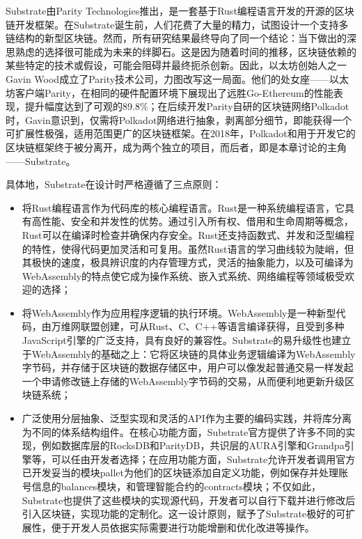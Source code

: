 Substrate\cite{substrateHome}由Parity Technologies推出，是一套基于Rust编程语言开发的开源的区块链开发框架。在Substrate诞生前，人们花费了大量的精力，试图设计一个支持多链结构的新型区块链。然而，所有研究结果最终导向了同一个结论：当下做出的深思熟虑的选择很可能成为未来的绊脚石。这是因为随着时间的推移，区块链依赖的某些特定的技术或假设，可能会阻碍并最终扼杀创新\cite{substrateDoc}。因此，以太坊创始人之一Gavin Wood成立了Parity技术公司，力图改写这一局面。他们的处女座——以太坊客户端Parity，在相同的硬件配置环境下展现出了远胜Go-Ethereum的性能表现，提升幅度达到了可观的89.8\%\cite{parityVSgeth}；在后续开发Parity自研的区块链网络Polkadot时，Gavin意识到，仅需将Polkadot网络进行抽象，剥离部分细节，即能获得一个可扩展性极强，适用范围更广的区块链框架。在2018年，Polkadot和用于开发它的区块链框架终于被分离开，成为两个独立的项目，而后者，即是本章讨论的主角——Substrate。

具体地，Substrate在设计时严格遵循了三点原则：

\begin{itemize}
    \item 将Rust编程语言作为代码库的核心编程语言。Rust是一种系统编程语言，它具有高性能、安全和并发性的优势\cite{rust}。通过引入所有权、借用和生命周期等概念，Rust可以在编译时检查并确保内存安全。Rust还支持函数式、并发和泛型编程的特性，使得代码更加灵活和可复用。虽然Rust语言的学习曲线较为陡峭，但其极快的速度，极具辨识度的内存管理方式，灵活的抽象能力，以及可编译为WebAssembly的特点使它成为操作系统、嵌入式系统、网络编程等领域极受欢迎的选择\cite{borgsmuller2021rust}；
    \item 将WebAssembly作为应用程序逻辑的执行环境。WebAssembly是一种新型代码，由万维网联盟创建，可从Rust、C、C++等语言编译获得，且受到多种JavaScript引擎的广泛支持，具有良好的兼容性\cite{wasmIntro}。Substrate的易升级性也建立于WebAssembly的基础之上：它将区块链的具体业务逻辑编译为WebAssembly字节码，并存储于区块链的数据存储区中，用户可以像发起普通交易一样发起一个申请修改链上存储的WebAssembly字节码的交易，从而便利地更新升级区块链系统；
    \item 广泛使用分层抽象、泛型实现和灵活的API作为主要的编码实践，并将库分离为不同的体系结构组件。在核心功能方面，Substrate官方提供了许多不同的实现，例如数据库层的RocksDB和ParityDB，共识层的AURA引擎和Grandpa引擎等，可以任由开发者选择；在应用功能方面，Substrate允许开发者调用官方已开发妥当的模块pallet为他们的区块链添加自定义功能，例如保存并处理账号信息的balances模块，和管理智能合约的contracts模块；不仅如此，Substrate也提供了这些模块的实现源代码，开发者可以自行下载并进行修改后引入区块链，实现功能的定制化。这一设计原则，赋予了Substrate极好的可扩展性，便于开发人员依据实际需要进行功能增删和优化改进等操作。
\end{itemize}


